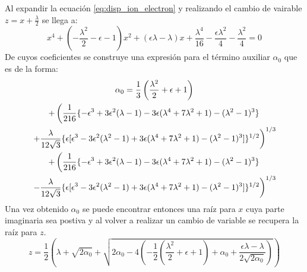 \documentclass[12pt]{article}
\begin{document}
Al expandir la ecuación \ref{eq:disp_ion_electron} y realizando el cambio de vairable $z=x+\frac{\lambda}{2}$ se llega a:
\begin{equation}
x^4 + (-\frac{\lambda^2}{2} -\epsilon -1)x^2 + (\epsilon \lambda - \lambda)x + \frac{\lambda^4}{16}-\frac{\epsilon \lambda^2}{4}-\frac{\lambda^2}{4}=0
\end{equation}
De cuyos coeficientes se construye una expresión para el término auxiliar $\alpha_0$ que es de la forma:
\begin{multline}
\alpha_0 = \frac{1}{3}\left(\frac{\lambda^2}{2} + \epsilon + 1 \right)\\
+ \left(\frac{1}{216}\lbrace-\epsilon^3+3\epsilon^2(\lambda-1)-
3\epsilon(\lambda^4 +7\lambda^2 +1)- (\lambda^2 -1)^3\rbrace \right. \\
\left. +\frac{\lambda}{12\sqrt{3}}\lbrace\epsilon [\epsilon^3-3\epsilon^2(\lambda^2 -1)+3\epsilon(\lambda^4 + 7\lambda^2 +1)- (\lambda^2-1)^3]\rbrace^{1/2} \vphantom{\frac{1}{216}}\right)^{1/3}\\
+ \left(\frac{1}{216}\lbrace-\epsilon^3+3\epsilon^2(\lambda-1)-
3\epsilon(\lambda^4 +7\lambda^2 +1)- (\lambda^2 -1)^3\rbrace \right. \\
\left. -\frac{\lambda}{12\sqrt{3}}\lbrace\epsilon [\epsilon^3-3\epsilon^2(\lambda^2 -1)+3\epsilon(\lambda^4 + 7\lambda^2 +1)- (\lambda^2-1)^3]\rbrace^{1/2} \vphantom{\frac{1}{216}}\right)^{1/3}
\end{multline}
Una vez obtenido $\alpha_0$ se puede encontrar entonces una raíz para $x$ cuya parte imaginaria sea postiva y al volver a realizar un cambio de variable se recupera la raíz para $z$.
\begin{equation}
z= \frac{1}{2} \left( \lambda + \sqrt{2\alpha_0} + \sqrt{2\alpha_0 -4 \left(-\frac{1}{2}(\frac{\lambda^2}{2}+\epsilon+1)+\alpha_0 +\frac{\epsilon \lambda - \lambda}{2\sqrt{2\alpha_0}}\right)}\right)
\end{equation}
\end{document}
